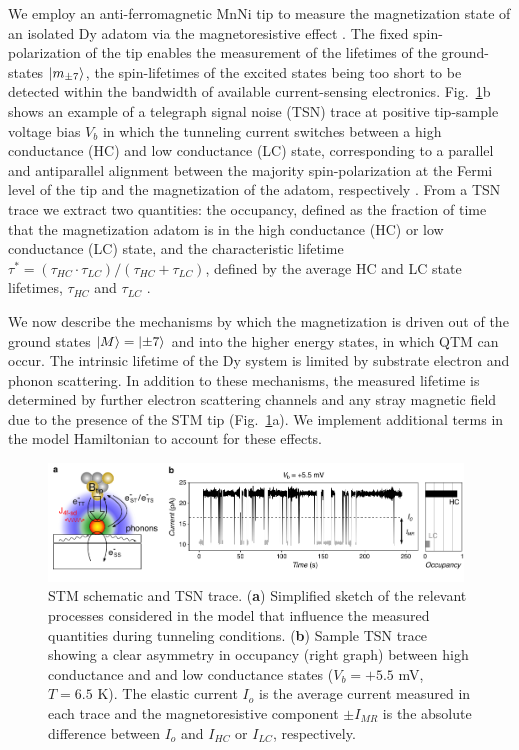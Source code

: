 \documentclass[
reprint,amsmath,amssymb,aps]{revtex4-2}
\begin{document}
We employ an anti-ferromagnetic MnNi tip to measure the magnetization state of an isolated Dy adatom via the magnetoresistive effect \cite{wiesendanger_ObservationVacuumTunneling_1990,Khajetoorians2013,paul_ControlMillisecondSpin_2017,Natterer2017,Natterer2018}. The fixed spin-polarization of the tip enables the measurement of the lifetimes of the ground-states $\ket{m_{\pm7}}$, the spin-lifetimes of the excited states being too short to be detected within the bandwidth of available current-sensing electronics. Fig.~\ref{fig:no_tip_tip_telegraph}b shows an example of a telegraph signal noise (TSN) trace at positive tip-sample voltage bias $V_b$ in which the tunneling current switches between a high conductance (HC) and low conductance (LC) state, corresponding to a parallel and antiparallel alignment between the majority spin-polarization at the Fermi level of the tip and the magnetization of the adatom, respectively \cite{delgado2010,paul_ControlMillisecondSpin_2017}. From a TSN trace we extract two quantities: the occupancy, defined as the fraction of time that the magnetization adatom is in the high conductance (HC) or low conductance (LC) state, and the characteristic lifetime $\tau ^*=(\tau_{HC}  \cdot \tau_{LC})/( \tau_{HC} + \tau_{LC})$, defined by the average HC and LC state lifetimes, $ \tau_{HC}$ and  $\tau_{LC}$ \cite{Khajetoorians2013}. 

We now describe the mechanisms by which the magnetization is driven out of the ground states $\ket{M}=\ket{\pm7}$ and into the higher energy states, in which QTM can occur. The intrinsic lifetime of the Dy system is limited by substrate electron and phonon scattering. In addition to these mechanisms, the measured lifetime is determined by further electron scattering channels and any stray magnetic field due to the presence of the STM tip (Fig.~\ref{fig:no_tip_tip_telegraph}a). We implement additional terms in the model Hamiltonian to account for these effects. 

\begin{figure}[ht!]
\includegraphics[width=0.98\textwidth]{Fig2_new.pdf}
\caption{STM schematic and TSN trace. (\textbf{a}) Simplified sketch of the relevant processes considered in the model that influence the measured quantities during tunneling conditions. (\textbf{b}) Sample TSN trace showing a clear asymmetry in occupancy (right graph) between high conductance and and low conductance states ($V_{b} = +5.5$ mV, $T = 6.5$ K). The elastic current $I_{o}$ is the average current measured in each trace and the magnetoresistive component $\pm I_{MR}$ is the absolute difference between $I_{o}$ and $I_{HC}$ or $I_{LC}$, respectively. 
\label{fig:no_tip_tip_telegraph} }
\end{figure}
\end{document}

